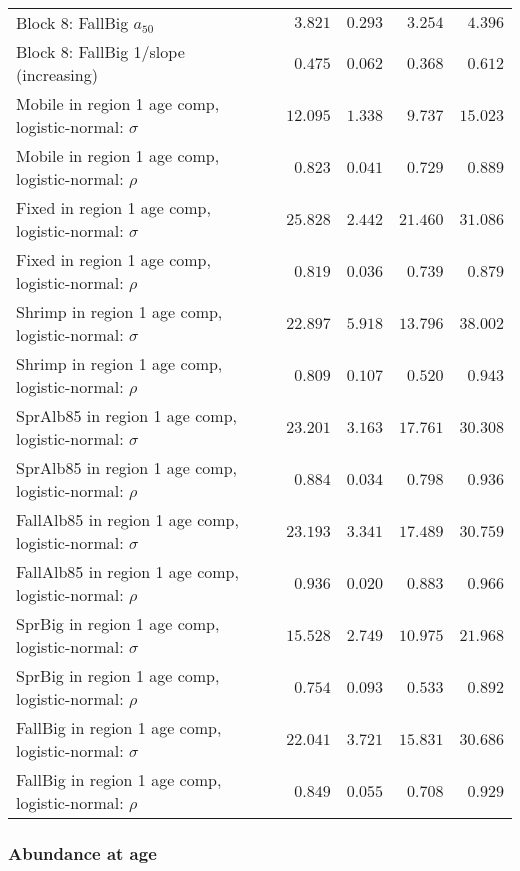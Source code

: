 \documentclass[
]{article}
\begin{document}
\begin{landscape}
\begin{longtable}[t]{lrrrr}
\addlinespace
Block 8: FallBig $a_{50}$ & $3.821$ & $0.293$ & $3.254$ & $4.396$\\
Block 8: FallBig 1/slope (increasing) & $0.475$ & $0.062$ & $0.368$ & $0.612$\\
Mobile in region 1 age comp, logistic-normal: $\sigma$ & $12.095$ & $1.338$ & $9.737$ & $15.023$\\
Mobile in region 1 age comp, logistic-normal: $\rho$ & $0.823$ & $0.041$ & $0.729$ & $0.889$\\
Fixed in region 1 age comp, logistic-normal: $\sigma$ & $25.828$ & $2.442$ & $21.460$ & $31.086$\\
\addlinespace
Fixed in region 1 age comp, logistic-normal: $\rho$ & $0.819$ & $0.036$ & $0.739$ & $0.879$\\
Shrimp in region 1 age comp, logistic-normal: $\sigma$ & $22.897$ & $5.918$ & $13.796$ & $38.002$\\
Shrimp in region 1 age comp, logistic-normal: $\rho$ & $0.809$ & $0.107$ & $0.520$ & $0.943$\\
SprAlb85 in region 1 age comp, logistic-normal: $\sigma$ & $23.201$ & $3.163$ & $17.761$ & $30.308$\\
SprAlb85 in region 1 age comp, logistic-normal: $\rho$ & $0.884$ & $0.034$ & $0.798$ & $0.936$\\
\addlinespace
FallAlb85 in region 1 age comp, logistic-normal: $\sigma$ & $23.193$ & $3.341$ & $17.489$ & $30.759$\\
FallAlb85 in region 1 age comp, logistic-normal: $\rho$ & $0.936$ & $0.020$ & $0.883$ & $0.966$\\
SprBig in region 1 age comp, logistic-normal: $\sigma$ & $15.528$ & $2.749$ & $10.975$ & $21.968$\\
SprBig in region 1 age comp, logistic-normal: $\rho$ & $0.754$ & $0.093$ & $0.533$ & $0.892$\\
FallBig in region 1 age comp, logistic-normal: $\sigma$ & $22.041$ & $3.721$ & $15.831$ & $30.686$\\
\addlinespace
FallBig in region 1 age comp, logistic-normal: $\rho$ & $0.849$ & $0.055$ & $0.708$ & $0.929$\\*
\end{longtable}
\end{landscape}

\hypertarget{abundance-at-age}{%
\subsubsection{Abundance at age}\label{abundance-at-age}}
\end{document}
